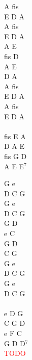 \documentclass[a5paper, 10pt]{book}
\begin{document}
\begin{minipage}[t]{0.15\textwidth}
A fis\\
E D A\\
A fis\\
E D A\\

A E\\
fis D\\
A E\\
D A\\

A fis\\
E D A\\
A fis\\
E D A\\

~\\

fis E A\\
D A E\\
fis G D\\
A E E$^7$\\
\end{minipage}
\begin{minipage}[t]{0.15\textwidth}
G e\\
D C G\\
G e\\
D C G\\

G D\\
e C\\
G D\\
C G\\

G e\\
D C G\\
G e\\
D C G\\

~\\

e D G\\
C G D\\
e F C\\
G D D$^7$\\

\textcolor{red}{TODO}\\
\end{minipage}

\newpage
\end{document}
